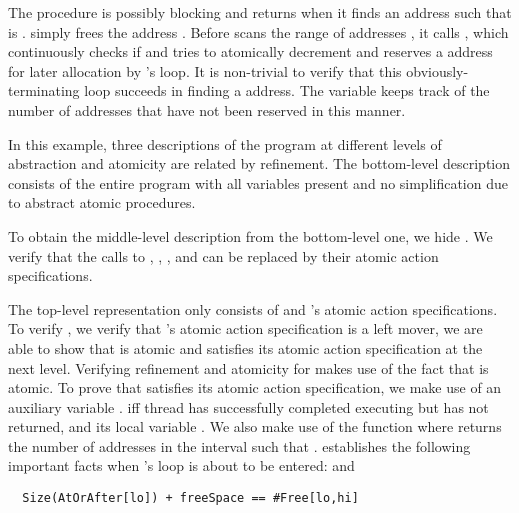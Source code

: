 The  procedure is possibly blocking and returns when it
finds an address  such that  is
.  simply frees the address
. 
Before  scans the range of addresses
\exC{[lo,hi]}, it calls , which continuously checks if
 and tries to atomically decrement 
and reserves a  address for later allocation by
's  loop. It is non-trivial to verify that this
obviously-terminating  loop succeeds in finding a
 address. The variable  keeps track of the
number of  addresses that have not been reserved in this
manner. 

In this example, three descriptions of the program at different levels
of abstraction and atomicity are related by refinement. 
The bottom-level description consists of the entire program with all
variables present and no simplification due to abstract atomic
procedures. 

To obtain the middle-level description from the bottom-level
  one, we hide . We verify that 
the calls to , ,
, and
 can be replaced by their atomic action
specifications. 

The top-level representation only
consists of  and 's atomic action
specifications. To verify , we verify that 's atomic
action specification is a left mover, we are able to show that  is
atomic and satisfies its atomic action specification at the next level. 
Verifying refinement and atomicity for  makes use
of the fact that  is atomic. To prove that 
satisfies its atomic action specification, we make use of an auxiliary
variable .  iff thread
 has successfully completed executing  but has
not returned, and its local variable . We also make use
of the function  where  returns the number
of addresses  in the interval \exC{[u,v]} such that
. 
establishes the following important facts when 's
 loop is about to be entered:  and 
\begin{verbatim}
  Size(AtOrAfter[lo]) + freeSpace == #Free[lo,hi] 
\end{verbatim}


%
%
%
%
%


